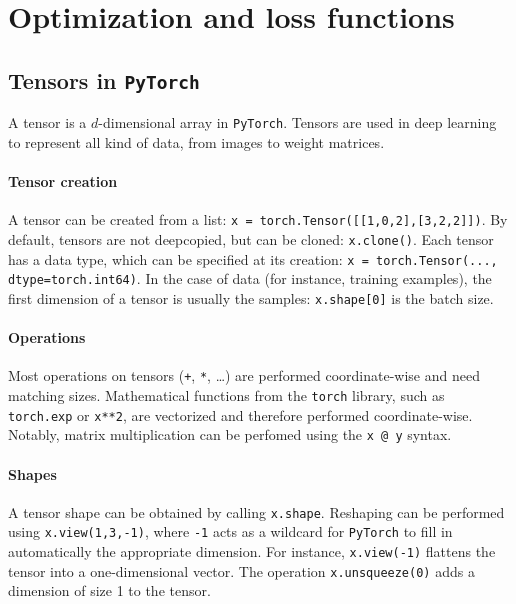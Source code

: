 \section{Optimization and loss functions}
\subsection{Tensors in \texttt{PyTorch}}
A tensor is a $d$-dimensional array in \texttt{PyTorch}. Tensors are used in deep learning to represent all kind of data, from images to weight matrices.

\paragraph*{Tensor creation}
A tensor can be created from a list: \texttt{x = torch.Tensor([[1,0,2],[3,2,2]])}. By default, tensors are not deepcopied, but can be cloned: \texttt{x.clone()}. Each tensor has a data type, which can be specified at its creation: \texttt{x = torch.Tensor(..., dtype=torch.int64)}. In the case of data (for instance, training examples), the first dimension of a tensor is usually the samples: \texttt{x.shape[0]} is the batch size.

\paragraph*{Operations}
Most operations on tensors (\texttt{+}, \texttt{*}, \dots) are performed coordinate-wise and need matching sizes. Mathematical functions from the \texttt{torch} library, such as \texttt{torch.exp} or \texttt{x**2}, are vectorized and therefore performed coordinate-wise. Notably, matrix multiplication can be perfomed using the \texttt{x @ y} syntax.

\paragraph*{Shapes}
A tensor shape can be obtained by calling \texttt{x.shape}. Reshaping can be performed using \texttt{x.view(1,3,-1)}, where \texttt{-1} acts as a wildcard for \texttt{PyTorch} to fill in automatically the appropriate dimension. For instance, \texttt{x.view(-1)} flattens the tensor into a one-dimensional vector. The operation \texttt{x.unsqueeze(0)} adds a dimension of size 1 to the tensor.

